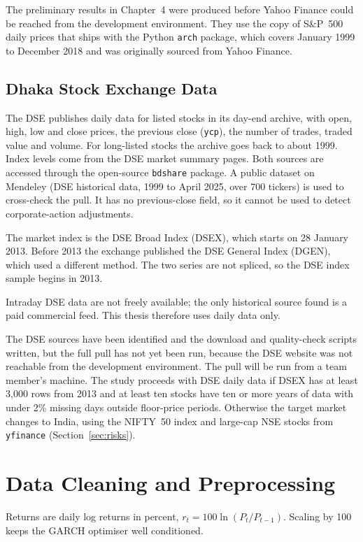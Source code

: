 The preliminary results in Chapter~4 were produced before Yahoo Finance could be reached
from the development environment. They use the copy of S\&P~500 daily prices that ships with
the Python \texttt{arch} package, which covers January 1999 to December 2018 and was
originally sourced from Yahoo Finance.

\subsection{Dhaka Stock Exchange Data}\label{sec:dse-data}
The DSE publishes daily data for listed stocks in its day-end archive, with open, high,
low and close prices, the previous close (\texttt{ycp}), the number of trades, traded value
and volume. For long-listed stocks the archive goes back to about 1999. Index levels come
from the DSE market summary pages. Both sources are accessed through the open-source
\texttt{bdshare} package. A public dataset on Mendeley (DSE historical data, 1999 to April
2025, over 700 tickers) is used to cross-check the pull. It has no previous-close field, so
it cannot be used to detect corporate-action adjustments.

The market index is the DSE Broad Index (DSEX), which starts on 28 January 2013. Before
2013 the exchange published the DSE General Index (DGEN), which used a different method. The
two series are not spliced, so the DSE index sample begins in 2013.

Intraday DSE data are not freely available; the only historical source found is a paid
commercial feed. This thesis therefore uses daily data only.

The DSE sources have been identified and the download and quality-check scripts
written, but the full pull has not yet been run, because the DSE website was not reachable
from the development environment. The pull will be run from a team member's machine. The
study proceeds with DSE daily data if DSEX has at least 3{,}000 rows from 2013 and at least
ten stocks have ten or more years of data with under 2\% missing days outside floor-price
periods. Otherwise the target market changes to India, using the NIFTY~50 index and
large-cap NSE stocks from \texttt{yfinance} (Section~\ref{sec:risks}).

\section{Data Cleaning and Preprocessing}
Returns are daily log returns in percent, $r_t = 100\ln(P_t/P_{t-1})$. Scaling by 100 keeps
the GARCH optimiser well conditioned.

